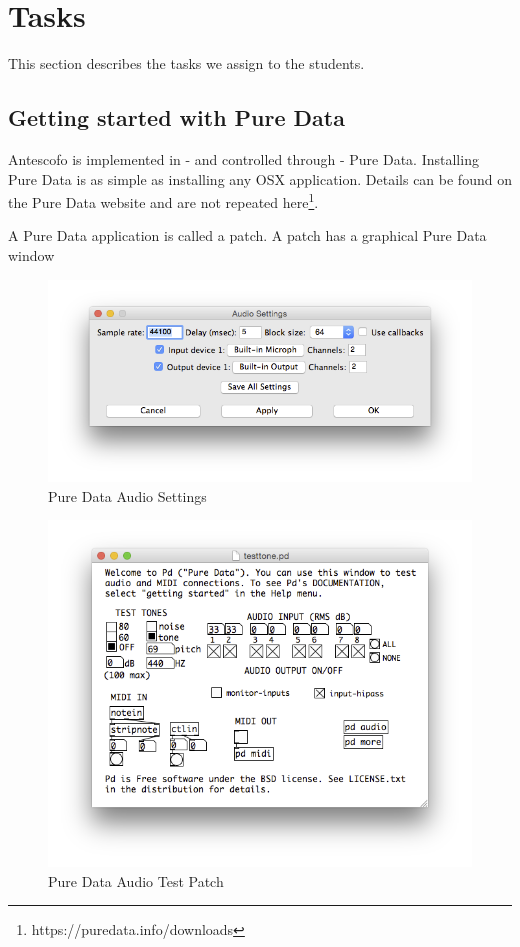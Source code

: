 \documentclass[onecolumn,nocopyrightspace,preprint]{sigplanconf}
\begin{document}
\section{Tasks}

This section describes the tasks we assign to the students.

\subsection{Getting started with Pure Data}


Antescofo is implemented in - and controlled through - Pure Data.
Installing Pure Data is as simple as installing any OSX application. Details can be found
on the Pure Data website and are not repeated here\footnote{https://puredata.info/downloads}.

A Pure Data application is called a patch. A patch has a graphical Pure Data window



\begin{figure}[ht]
    \centering
    \includegraphics[scale=0.4]{fig/pd-audio.png}
    \caption{Pure Data Audio Settings}
    \label{fig:pd-audio}
\end{figure}


\begin{figure}[ht]
    \centering
    \includegraphics[scale=0.4]{fig/pd-test.png}
    \caption{Pure Data Audio Test Patch}
    \label{fig:pd-test}
\end{figure}
\end{document}
